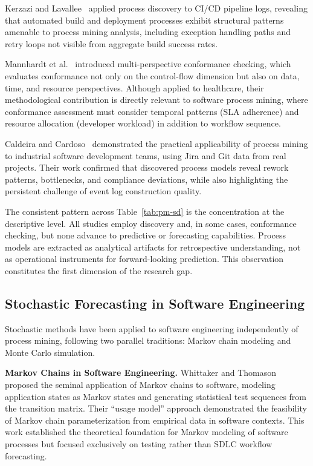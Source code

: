 Kerzazi and Lavallee~\cite{Kerzazi2019ProcessMiningCI} applied process
discovery to CI/CD pipeline logs, revealing that automated build and
deployment processes exhibit structural patterns amenable to process
mining analysis, including exception handling paths and retry loops not
visible from aggregate build success rates.

Mannhardt et al.~\cite{Mannhardt2016MultiPerspective} introduced multi-perspective
conformance checking, which evaluates conformance not only on the
control-flow dimension but also on data, time, and resource
perspectives. Although applied to healthcare, their methodological
contribution is directly relevant to software process mining, where
conformance assessment must consider temporal patterns (SLA adherence)
and resource allocation (developer workload) in addition to workflow
sequence.

Caldeira and Cardoso~\cite{Caldeira2019AssessingSoftwareTeams} demonstrated the
practical applicability of process mining to industrial software
development teams, using Jira and Git data from real projects. Their
work confirmed that discovered process models reveal rework patterns,
bottlenecks, and compliance deviations, while also highlighting the
persistent challenge of event log construction quality.

The consistent pattern across Table~\ref{tab:pm-sd} is the concentration
at the descriptive level. All studies employ discovery and, in some
cases, conformance checking, but none advance to predictive or
forecasting capabilities. Process models are extracted as analytical
artifacts for retrospective understanding, not as operational instruments
for forward-looking prediction. This observation constitutes the first
dimension of the research gap.


\subsection{Stochastic Forecasting in Software Engineering}
\label{sec:rw-stochastic}

Stochastic methods have been applied to software engineering
independently of process mining, following two parallel traditions:
Markov chain modeling and Monte Carlo simulation.

\textbf{Markov Chains in Software Engineering.} Whittaker and
Thomason~\cite{whittaker1994} proposed the seminal application of
Markov chains to software, modeling application states as Markov states
and generating statistical test sequences from the transition matrix.
Their ``usage model'' approach demonstrated the feasibility of Markov
chain parameterization from empirical data in software contexts. This
work established the theoretical foundation for Markov modeling of
software processes but focused exclusively on testing rather than
SDLC workflow forecasting.

